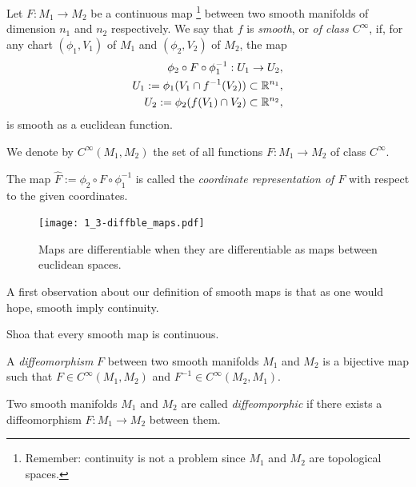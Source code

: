 \begin{defn}
  Let $F:M_1\to M_2$ be a continuous map \footnote{Remember: continuity is not a problem since $M_1$ and $M_2$ are topological spaces.} between two smooth manifolds of dimension $n_1$ and $n_2$ respectively.
  We say that $f$ is \emph{smooth}, or \emph{of class $C^\infty$}, if, for any chart $(\phi_1, V_1)$ of $M_1$ and $(\phi_2, V_2)$ of $M_2$, the map
  \begin{align}
    \phi_2 \circ F \circ \phi_1^{-1}: U_1 \to U_2,\\
    U_1 := \phi_1(V_1 \cap f^{-1}(V_2))\subset\mathbb{R}^{n_1},\\
    U_2 := \phi_2(f(V_1) \cap V_2)\subset\mathbb{R}^{n_2},
  \end{align}
  is smooth as a euclidean function.

  We denote by $C^\infty(M_1, M_2)$ the set of all functions $F:M_1\to M_2$ of class $C^\infty$.

  The map $\hat F := \phi_2 \circ F \circ \phi_1^{-1}$ is called the \emph{coordinate representation of $F$} with respect to the given coordinates.
\end{defn}

\begin{figure}[htp]
  \centering
  \texttt{[image: 1\_3-diffble\_maps.pdf]}
  \caption{Maps are differentiable when they are differentiable as maps between euclidean spaces.}
  \label{fig:1.3-differentiable_maps}
\end{figure}

A first observation about our definition of smooth maps is that as one would hope, smooth imply continuity.

\begin{exe}
  Shoa that every smooth map is continuous.
\end{exe}

\begin{defn}
A \emph{diffeomorphism} $F$ between two smooth manifolds $M_1$ and $M_2$ is a bijective map such that $F\in C^\infty(M_1, M_2)$ and $F^{-1}\in C^\infty(M_2, M_1)$.

Two smooth manifolds $M_1$ and $M_2$ are called \emph{diffeomporphic} if there exists a diffeomorphism $F:M_1\to M_2$ between them.
\end{defn}

